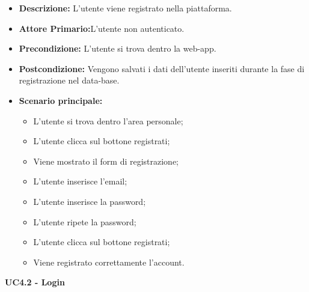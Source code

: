 \begin{itemize}
    \item \textbf{Descrizione:} L'utente viene registrato nella piattaforma.
    \item \textbf{Attore Primario:}L'utente non autenticato.
    \item \textbf{Precondizione:} L'utente si trova dentro la web-app.
    \item \textbf{Postcondizione:} Vengono salvati i dati dell'utente inseriti durante la fase di registrazione nel data-base.
    \item \textbf{Scenario principale:}
    \begin{itemize}
        \item L'utente si trova dentro l'area personale;
        \item L'utente clicca sul bottone registrati;
        \item Viene mostrato il form di registrazione;
        \item L'utente inserisce l'email;
        \item L'utente inserisce la password;
        \item L'utente ripete la password;
        \item L'utente clicca sul bottone registrati;
        \item Viene registrato correttamente l'account.
    \end{itemize}
\end{itemize}
\textbf{UC4.2 - Login}
